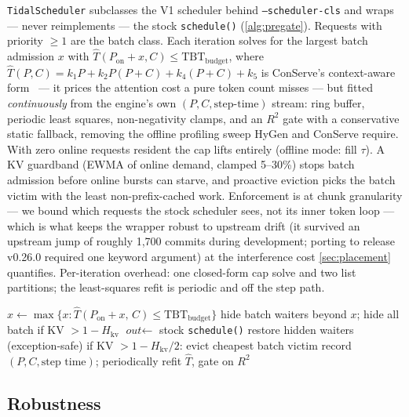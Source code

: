 \documentclass[conference]{IEEEtran}
\newcommand{\code}[1]{\texttt{#1}}
\begin{document}
\code{TidalScheduler} subclasses the V1 scheduler behind \code{--scheduler-cls} and wraps
--- never reimplements --- the stock \code{schedule()} (\cref{alg:pregate}). Requests
with priority $\ge 1$ are the batch class. Each iteration solves for the largest batch
admission $x$ with $\hat{T}(P_{\mathrm{on}} + x, C) \le \mathrm{TBT}_{\mathrm{budget}}$,
where $\hat{T}(P,C) = k_1 P + k_2 P(P{+}C) + k_4 (P{+}C) + k_5$ is ConServe's
context-aware form~\citep{conserve} --- it prices the attention cost a pure token count
misses --- but fitted \emph{continuously} from the engine's own $(P, C,
\text{step-time})$ stream: ring buffer, periodic least squares, non-negativity clamps,
and an $R^2$ gate with a conservative static fallback, removing the offline profiling
sweep HyGen and ConServe require. With zero online requests resident the cap lifts
entirely (offline mode: fill $\tau$). A KV guardband (EWMA of online demand, clamped
5--30\%) stops batch admission before online bursts can starve, and proactive eviction
picks the batch victim with the least non-prefix-cached work. Enforcement is at chunk
granularity --- we bound which requests the stock scheduler sees, not its inner token
loop --- which is what keeps the wrapper robust to upstream drift (it survived an
upstream jump of roughly 1{,}700 commits during development; porting to release v0.26.0
required one keyword argument) at the interference cost \cref{sec:placement} quantifies. Per-iteration
overhead: one closed-form cap solve and two list partitions; the least-squares refit is
periodic and off the step path.

\begin{algorithm}[t]
\small
\caption{TidalScheduler pre-gate (one iteration)}
\label{alg:pregate}
\begin{algorithmic}[1]
\State $x \gets \max\{x : \hat{T}(P_{\mathrm{on}}{+}x,\,C) \le \mathrm{TBT}_{\mathrm{budget}}\}$
  \Statex \hfill {}
\State hide batch waiters beyond $x$; hide all batch if KV $> 1{-}H_{\mathrm{kv}}$
\State $\textit{out} \gets$ stock \code{schedule()}
  \Statex \hfill {}
\State restore hidden waiters (exception-safe)
\State if KV $> 1 - H_{\mathrm{kv}}/2$: evict cheapest batch victim
\State record $(P, C, \text{step time})$; periodically refit $\hat{T}$, gate on $R^2$
\end{algorithmic}
\end{algorithm}



\subsection{Robustness}
\label{sec:robustness}
\end{document}
